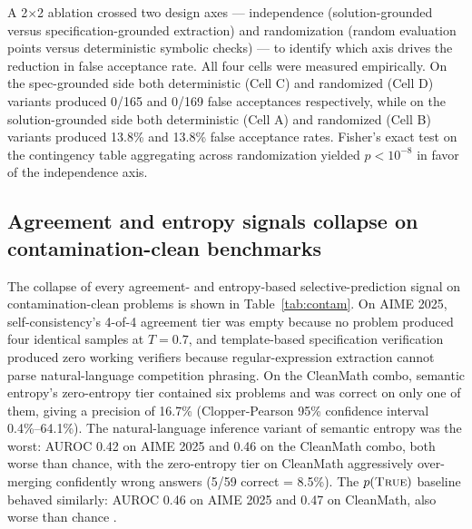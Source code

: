 \documentclass[11pt]{article}
\begin{document}
A 2$\times$2 ablation crossed two design axes --- independence (solution-grounded versus specification-grounded extraction) and randomization (random evaluation points versus deterministic symbolic checks) --- to identify which axis drives the reduction in false acceptance rate. All four cells were measured empirically. On the spec-grounded side both deterministic (Cell C) and randomized (Cell D) variants produced 0/165 and 0/169 false acceptances respectively, while on the solution-grounded side both deterministic (Cell A) and randomized (Cell B) variants produced 13.8\% and 13.8\% false acceptance rates. Fisher's exact test on the contingency table aggregating across randomization yielded $p<10^{-8}$ in favor of the independence axis.

\subsection{Agreement and entropy signals collapse on contamination-clean benchmarks}

The collapse of every agreement- and entropy-based selective-prediction signal on contamination-clean problems is shown in Table~\ref{tab:contam}. On AIME 2025, self-consistency's 4-of-4 agreement tier was empty because no problem produced four identical samples at $T=0.7$, and template-based specification verification produced zero working verifiers because regular-expression extraction cannot parse natural-language competition phrasing. On the CleanMath combo, semantic entropy's zero-entropy tier contained six problems and was correct on only one of them, giving a precision of 16.7\% (Clopper-Pearson 95\% confidence interval 0.4\%--64.1\%). The natural-language inference variant of semantic entropy was the worst: AUROC 0.42 on AIME 2025 and 0.46 on the CleanMath combo, both worse than chance, with the zero-entropy tier on CleanMath aggressively over-merging confidently wrong answers (5/59 correct = 8.5\%). The $p(\textsc{True})$ baseline behaved similarly: AUROC 0.46 on AIME 2025 and 0.47 on CleanMath, also worse than chance \citep{kadavath2022}.
\end{document}
